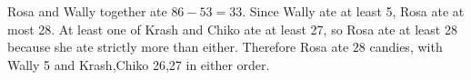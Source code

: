 Rosa and Wally together ate $86-53=33$. Since Wally ate at least 5, Rosa ate at most 28. At least one of Krash and Chiko ate at least 27, so Rosa ate at least 28 because she ate strictly more than either. Therefore Rosa ate $\boxed{28}$ candies, with Wally 5 and Krash,Chiko 26,27 in either order.
